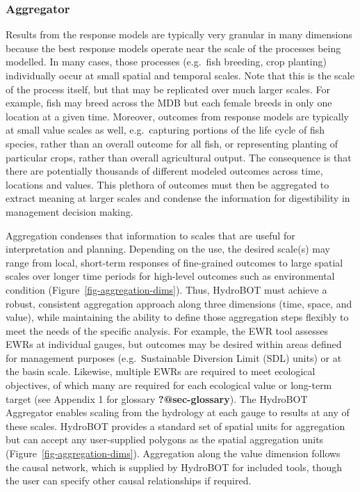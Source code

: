 \documentclass[
  number]{elsarticle}
\begin{document}
\hypertarget{sec-aggregator}{%
\subsubsection{Aggregator}\label{sec-aggregator}}

Results from the response models are typically very granular in many
dimensions because the best response models operate near the scale of
the processes being modelled. In many cases, those processes (e.g.~fish
breeding, crop planting) individually occur at small spatial and
temporal scales. Note that this is the scale of the process itself, but
that may be replicated over much larger scales. For example, fish may
breed across the MDB but each female breeds in only one location at a
given time. Moreover, outcomes from response models are typically at
small value scales as well, e.g.~capturing portions of the life cycle of
fish species, rather than an overall outcome for all fish, or
representing planting of particular crops, rather than overall
agricultural output. The consequence is that there are potentially
thousands of different modeled outcomes across time, locations and
values. This plethora of outcomes must then be aggregated to extract
meaning at larger scales and condense the information for digestibility
in management decision making.

Aggregation condenses that information to scales that are useful for
interpretation and planning. Depending on the use, the desired scale(s)
may range from local, short-term responses of fine-grained outcomes to
large spatial scales over longer time periods for high-level outcomes
such as environmental condition (Figure~\ref{fig-aggregation-dims}).
Thus, HydroBOT must achieve a robust, consistent aggregation approach
along three dimensions (time, space, and value), while maintaining the
ability to define those aggregation steps flexibly to meet the needs of
the specific analysis. For example, the EWR tool assesses EWRs at
individual gauges, but outcomes may be desired within areas defined for
management purposes (e.g.~Sustainable Diversion Limit (SDL) units) or at
the basin scale. Likewise, multiple EWRs are required to meet ecological
objectives, of which many are required for each ecological value or
long-term target (see Appendix 1 for glossary \textbf{?@sec-glossary}).
The HydroBOT Aggregator enables scaling from the hydrology at each gauge
to results at any of these scales. HydroBOT provides a standard set of
spatial units for aggregation but can accept any user-supplied polygons
as the spatial aggregation units (Figure~\ref{fig-aggregation-dims}).
Aggregation along the value dimension follows the causal network, which
is supplied by HydroBOT for included tools, though the user can specify
other causal relationships if required.
\end{document}
